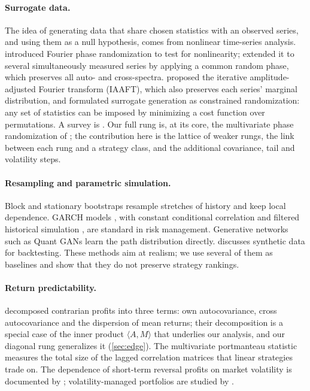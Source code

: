 \documentclass[11pt]{article}
\theoremstyle{definition}
\theoremstyle{remark}
\newcommand{\ip}[2]{\langle #1, #2 \rangle}
\begin{document}
\paragraph{Surrogate data.} The idea of generating data that share chosen statistics with an observed series, and
using them as a null hypothesis, comes from nonlinear time-series analysis. \citet{theiler1992} introduced Fourier
phase randomization to test for nonlinearity; \citet{prichard1994} extended it to several simultaneously measured
series by applying a common random phase, which preserves all auto- and cross-spectra.
\citet{schreiber1996} proposed the iterative amplitude-adjusted Fourier transform (IAAFT), which also preserves each
series' marginal distribution, and \citet{schreiber1998} formulated surrogate generation as constrained randomization:
any set of statistics can be imposed by minimizing a cost function over permutations. A survey is \citet{schreiber2000}.
Our full rung is, at its core, the multivariate phase randomization of \citet{prichard1994}; the contribution here is the
lattice of weaker rungs, the link between each rung and a strategy class, and the additional covariance, tail and
volatility steps.

\paragraph{Resampling and parametric simulation.} Block and stationary bootstraps \citep{kunsch1989,politis1994}
resample stretches of history and keep local dependence. GARCH models \citep{bollerslev1986}, with constant conditional
correlation \citep{bollerslev1990} and filtered historical simulation \citep{baroneadesi1999}, are standard in risk
management. Generative networks such as Quant GANs \citep{wiese2020} learn the path distribution directly.
\citet{lopezdeprado2018} discusses synthetic data for backtesting. These methods aim at realism; we use several of them as
baselines and show that they do not preserve strategy rankings.

\paragraph{Return predictability.} \citet{lo1990} decomposed contrarian profits into three terms: own autocovariance,
cross autocovariance and the dispersion of mean returns; their decomposition is a special case of the inner product
$\ip{A}{M}$ that underlies our analysis, and our diagonal rung generalizes it (\cref{sec:edge}). The multivariate
portmanteau statistic \citep{hosking1980} measures the total size of the lagged correlation matrices that linear
strategies trade on. The dependence of short-term reversal profits on market volatility is documented by
\citet{nagel2012}; volatility-managed portfolios are studied by \citet{moreira2017}.
\end{document}
